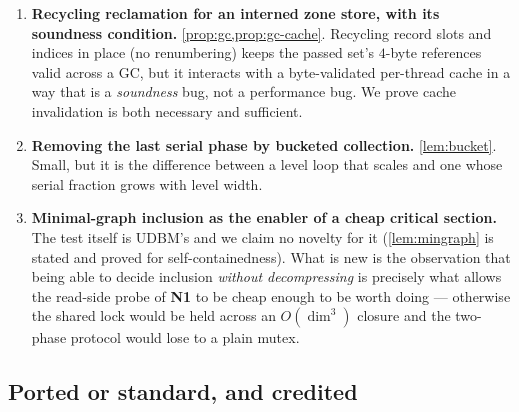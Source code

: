 \begin{enumerate}[label=\textbf{N\arabic*.}, leftmargin=2.2em, itemsep=4pt]
\item \textbf{Recycling reclamation for an interned zone store, with its
      soundness condition.}  \cref{prop:gc,prop:gc-cache}.  Recycling record
      slots and indices in place (no renumbering) keeps the passed set's
      $4$-byte references valid across a GC, but it interacts with a
      byte-validated per-thread cache in a way that is a \emph{soundness} bug,
      not a performance bug.  We prove cache invalidation is both necessary and
      sufficient.

\item \textbf{Removing the last serial phase by bucketed collection.}
      \cref{lem:bucket}.  Small, but it is the difference between a level loop
      that scales and one whose serial fraction grows with level width.

\item \textbf{Minimal-graph inclusion as the enabler of a cheap critical
      section.}  The test itself is UDBM's and we claim no novelty for it
      (\cref{lem:mingraph} is stated and proved for self-containedness).  What
      is new is the observation that being able to decide inclusion
      \emph{without decompressing} is precisely what allows the read-side probe
      of \textbf{N1} to be cheap enough to be worth doing --- otherwise the
      shared lock would be held across an $O(\dim^3)$ closure and the two-phase
      protocol would lose to a plain mutex.
\end{enumerate}

\subsection{Ported or standard, and credited}

